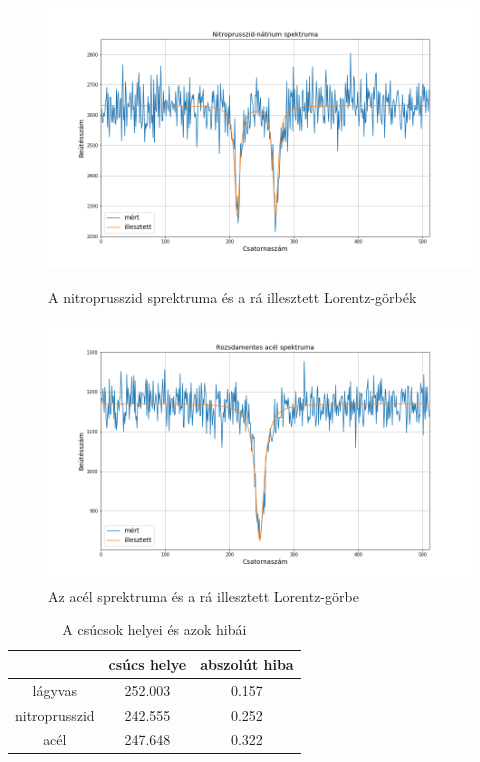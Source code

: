\documentclass[a4paper,12pt]{article}
\begin{document}
\begin{figure}[!htb]
    \centering
    \begin{minipage}{.49\textwidth}
        \centering
        \includegraphics[width=1.\linewidth]{np.png}
        \caption{A nitroprusszid sprektruma és a rá illesztett Lorentz-görbék}
    \end{minipage}
    \begin{minipage}{.49\textwidth}
        \centering
        \includegraphics[width=1.\linewidth]{acel.png}
        \caption{Az acél sprektruma és a rá illesztett Lorentz-görbe}
    \end{minipage}
\end{figure}

\begin{table}[!h]
\begin{center}
\begin{tabular}{|c|c|c|}
\hline
 & csúcs helye & abszolút hiba \\
\hline
lágyvas & 252.003 & 0.157 \\
\hline
nitroprusszid & 242.555 & 0.252 \\
\hline
acél & 247.648 & 0.322 \\
\hline
\end{tabular}
\end{center}
\caption{A csúcsok helyei és azok hibái}
\end{table}
\end{document}
